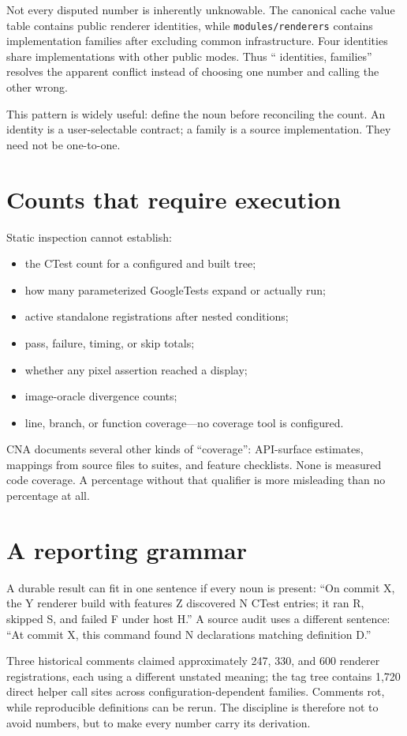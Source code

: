 Not every disputed number is inherently unknowable.  The canonical cache value table contains
\RendererIdentityCount{} public renderer identities, while \texttt{modules/renderers} contains
\RendererFamilyCount{} implementation
families after excluding common infrastructure.  Four identities share implementations with
other public modes. Thus ``\RendererIdentityCount{} identities, \RendererFamilyCount{} families''
resolves the apparent conflict instead
of choosing one number and calling the other wrong.

This pattern is widely useful: define the noun before reconciling the count.  An identity is a
user-selectable contract; a family is a source implementation.  They need not be one-to-one.

\section{Counts that require execution}

Static inspection cannot establish:

\begin{itemize}
  \item the CTest count for a configured and built tree;
  \item how many parameterized GoogleTests expand or actually run;
  \item active standalone registrations after nested conditions;
  \item pass, failure, timing, or skip totals;
  \item whether any pixel assertion reached a display;
  \item image-oracle divergence counts;
  \item line, branch, or function coverage---no coverage tool is configured.
\end{itemize}

CNA documents several other kinds of ``coverage'': API-surface estimates, mappings from source
files to suites, and feature checklists.  None is measured code coverage.  A percentage without
that qualifier is more misleading than no percentage at all.

\section{A reporting grammar}

A durable result can fit in one sentence if every noun is present: ``On commit X, the Y renderer
build with features Z discovered N CTest entries; it ran R, skipped S, and failed F under host
H.''  A source audit uses a different sentence: ``At commit X, this command found N declarations
matching definition D.''

Three historical comments claimed approximately 247, 330, and 600 renderer registrations, each
using a different unstated meaning; the tag tree contains 1,720 direct helper call sites across
configuration-dependent families.  Comments rot, while reproducible definitions can be rerun.  The
discipline is therefore not to avoid numbers, but to make every number carry its derivation.
